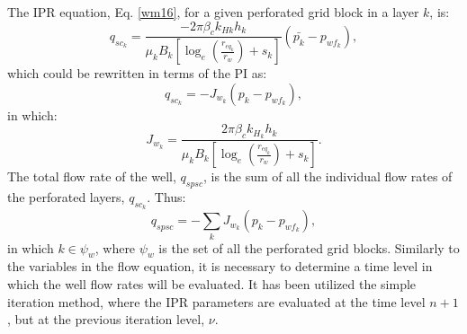 The IPR equation, Eq. \ref{wm16}, for a given perforated grid block in a layer $k$, is:
\begin{equation}
\label{wm20}
q_{{sc}_k} = \frac{- 2 \pi \beta_c k_{H k} h_k}{\mu_k B_k \left[ \log_e \left(\frac{r_{eq_k}}{r_w}\right) + s_k\right]} (\bar{p_k}-p_{{wf}_k}),
\end{equation}
which could be rewritten in terms of the PI as:
\begin{equation}
\label{wm21}
q_{{sc}_k} = - J_{w_k} \left( p_k - p_{wf_k} \right),
\end{equation}
in which:
\begin{equation}
\label{wm22}
J_{w_k} = \frac{ 2 \pi \beta_c k_{H_k} h_k}{\mu_k B_k\left[ \log_e \left(\frac{r_{eq_k}}{r_w}\right) + s_k\right]}.
\end{equation}
The total flow rate of the well, $q_{spsc}$, is the sum of all the individual flow rates of the perforated layers, $q_{{sc}_k}$. Thus:
\begin{equation}
\label{wm23}
q_{spsc} = - \sum_{k} J_{w_k} (p_k- p_{wf_k}),
\end{equation}
in which $k \in \psi_w$, where $\psi_w$ is the set of all the perforated grid blocks. Similarly to the variables in the flow equation, it is necessary to determine a time level in which the well flow rates will be evaluated. It has been utilized the simple iteration method, where the IPR parameters are evaluated at the time level $n+1$, but at the previous iteration level, $\nu$.


